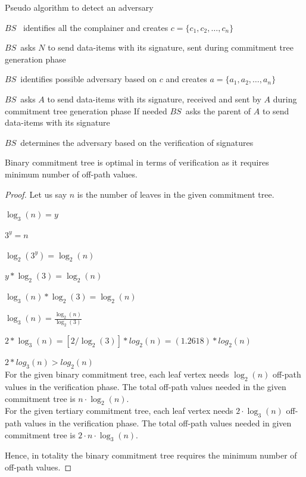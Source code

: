 		\begin{algorithm}
		\caption{Pseudo algorithm to detect an adversary}
		\label{algo:detect-an-adversary}

			\begin{algorithmic}[1]

					\STATE $BS$ \ identifies all the complainer and creates $c = \{c_{1}, c_{2}, \dotsc, c_{n}\}$

						\STATE $BS$\ asks $N$ to send data-items with its signature, sent during commitment tree generation phase
					
					\ENDFOR

					\STATE $BS$\ identifies possible adversary based on $c$ and creates $a = \{a_{1},a_{2},\dotsc,a_{n}\}$


						\STATE $BS$\ asks $A$ to send data-items with its signature, received and sent by $A$ during commitment tree generation phase
						\STATE If needed $BS$\  asks the parent of $A$ to send data-items with its signature
			
					\ENDFOR

					\STATE $BS$\ determines the adversary based on the verification of signatures

			\end{algorithmic}
		\end{algorithm}

	\begin{theorem}
		\label{Commitment tree}
		Binary commitment tree is optimal in terms of verification as it requires minimum number of off-path values.
	\end{theorem}

	\begin{proof}
		Let us say $n$ is the number of leaves in the given commitment tree.

		$ \log _3( n ) = y $

		$ 3^y = n $

		$ \log_2( 3^y ) = \log_2( n ) $

		$ y * \log_2( 3 ) = \log_2( n ) $

		$ \log_3( n )*\log_2( 3 ) = \log_2( n ) $

		$ \log_3( n ) = \frac{ {\log _2 ( n )} }{{\log _2 ( 3 )}} $

		$ 2 * \log_3( n ) = [2 / \log_2( 3 ) ]* log_2( n ) = ( 1.2618 ) * log_2( n ) $

		$ 2 * log_3( n ) > log_2( n ) $ \\
		For the given binary commitment tree, each leaf vertex needs $\log_{2}(n)$ off-path values in the verification phase.
		The total off-path values needed in the given commitment tree is $n \cdot \log_{2}(n)$.\\
		For the given tertiary commitment tree, each leaf vertex needs $2 \cdot \log_{3}(n)$ off-path values in the verification phase.
		The total off-path values needed in given commitment tree is $2 \cdot n \cdot \log_{3}(n)$.

		Hence, in totality the binary commitment tree requires the minimum number of off-path values.
	\end{proof}

